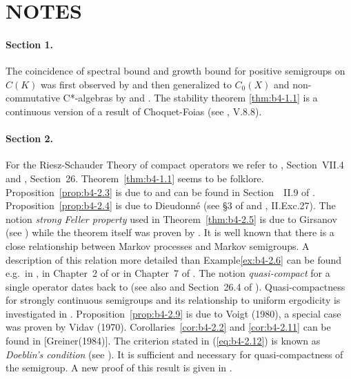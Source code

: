 \section*{NOTES}

\paragraph{Section 1.} The coincidence of spectral bound and growth bound for positive semigroups on $C(K)$ was first observed by \citet{derendinger:1980} and then generalized to $C_0(X)$ and non-commutative C*-algebras by \citet{battydavies:1982} and \citet{grohneubrander:1981}. The stability theorem \ref{thm:b4-1.1} is a continuous version of a result of Choquet-Foias (see \citet{schaefer:1974}, V.8.8).

\paragraph{Section 2.} For the Riesz-Schauder Theory of compact operators we refer to \citet{dunfordschwartz:1958}, Section~VII.4 and \citet{pietsch:1978}, Section~26. 
Theorem~\ref{thm:b4-1.1} seems to be folklore. Proposition~\ref{prop:b4-2.3} is due to \citet{grothendieck:1953} and can be found in Section~~II.9 of \citet{schaefer:1974}. Proposition~\ref{prop:b4-2.4} is due to Dieudonné (see §3 of \citet{grothendieck:1953} and \citet{schaefer:1974}, II.Exc.27). The notion \emph{strong Feller property} used in Theorem~\ref{thm:b4-2.5} is due to Girsanov (see \citet{dynkin:1965}) while the theorem itself was proven by \citet{davies:1982}. It is well known that there is a close relationship between Markov processes and Markov semigroups. A description of this relation more detailed than Example\ref{ex:b4-2.6} can be found e.g.\ in \citet{dynkin:1965}, in Chapter~2 of \citet{vancasteren:1985} or in Chapter~7 of \citet{lamperti:1977}. The notion \emph{quasi-compact} for a single operator dates back to \citet{eberlein:1949} (see also \citet{yosidakakutani:1941} and Section~26.4 of \citet{pietsch:1978}). Quasi-compactness for strongly continuous semigroups and its relationship to uniform ergodicity is investigated in \citet{lin:1975}. Proposition~\ref{prop:b4-2.9} is due to Voigt (1980), a special case was proven by Vidav (1970). Corollaries~\ref{cor:b4-2.2} and \ref{cor:b4-2.11} can be found in [Greiner(1984)]. The criterion stated in (\ref{eq:b4-2.12}) is known as \emph{Doeblin's condition} (see \eg \citet{yosidakakutani:1941}). It is sufficient and
%
\newpage
%
necessary for quasi-compactness of the semigroup. A new proof of this result is given in \citet{lotz:1981}.

